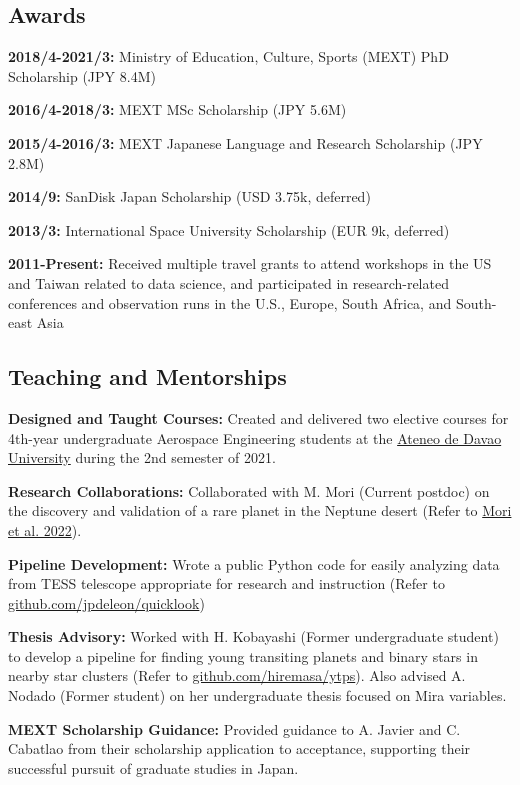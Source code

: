 \documentclass[11pt,letterpaper]{article}
\begin{document}
\subsection{Awards}
\begin{list}{}{\cvlist}
    \item \textbf{2018/4-2021/3:} Ministry of Education, Culture, Sports (MEXT) PhD Scholarship (JPY 8.4M)
    \item \textbf{2016/4-2018/3:} MEXT MSc Scholarship (JPY 5.6M)
    \item \textbf{2015/4-2016/3:} MEXT Japanese Language and Research Scholarship (JPY 2.8M)
    \item \textbf{2014/9:} SanDisk Japan Scholarship (USD 3.75k, deferred)
    \item \textbf{2013/3:} International Space University Scholarship (EUR 9k, deferred)
    \item \textbf{2011-Present:} Received multiple travel grants to attend workshops in the US and Taiwan related to data science, and participated in research-related conferences and observation runs in the U.S., Europe, South Africa, and South-east Asia
\end{list}

\subsection{Teaching and Mentorships}
\begin{list}{}{\cvlist}
    \item \textbf{Designed and Taught Courses:} Created and delivered two elective courses for 4th-year undergraduate Aerospace Engineering students at the \href{http://sea.addu.edu.ph/programs/aerospace-engineering/}{Ateneo de Davao University} during the 2nd semester of 2021.
    \item \textbf{Research Collaborations:} Collaborated with M. Mori (Current postdoc) on the discovery and validation of a rare planet in the Neptune desert (Refer to \href{https://ui.adsabs.harvard.edu/abs/2022AJ....163..298M/abstract}{Mori et al. 2022}).%
    \item \textbf{Pipeline Development:} Wrote a public Python code for easily analyzing data from TESS telescope appropriate for research and instruction (Refer to \href{https://github.com/jpdeleon/quicklook}{github.com/jpdeleon/quicklook})
    \item \textbf{Thesis Advisory:} Worked with H. Kobayashi (Former undergraduate student) to develop a pipeline for finding young transiting planets and binary stars in nearby star clusters (Refer to \href{https://github.com/hiremasa/ytps}{github.com/hiremasa/ytps}). Also advised A. Nodado (Former student) on her undergraduate thesis focused on Mira variables.
    \item \textbf{MEXT Scholarship Guidance:} Provided guidance to A. Javier and C. Cabatlao from their scholarship application to acceptance, supporting their successful pursuit of graduate studies in Japan.
\end{list}
\end{document}
